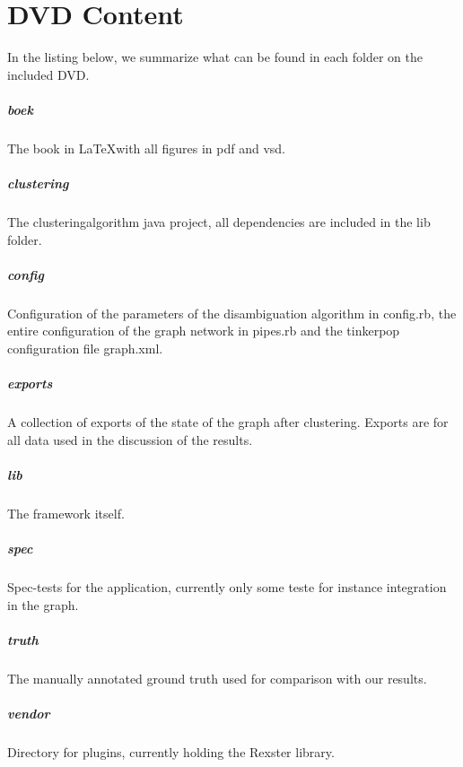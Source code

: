 \chapter{DVD Content}

In the listing below, we summarize what can be found in each folder on the included DVD.

\paragraph{boek} The book in \LaTeX with all figures in pdf and vsd.

\paragraph{clustering} The clusteringalgorithm java project, all dependencies are included in the lib folder.

\paragraph{config} Configuration of the parameters of the disambiguation algorithm in config.rb, the entire configuration of the graph network in pipes.rb and the tinkerpop configuration file graph.xml.

\paragraph{exports} A collection of exports of the state of the graph after clustering. Exports are for all data used in the discussion of the results.

\paragraph{lib} The framework itself.

\paragraph{spec} Spec-tests for the application, currently only some teste for instance integration in the graph.

\paragraph{truth} The manually annotated ground truth used for comparison with our results.

\paragraph{vendor} Directory for plugins, currently holding the Rexster library.